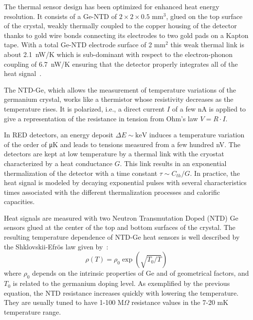 The thermal sensor design has been optimized for enhanced heat energy resolution. It consists of a Ge-NTD of $2\times 2\times 0.5$ mm$^3$, glued on the top surface of the crystal, weakly thermally coupled to the copper housing of the detector thanks to gold wire bonds connecting its electrodes to two gold pads on a Kapton tape. With a total Ge-NTD electrode surface of 2 mm$^2$ this weak thermal link is about 2.1~nW/K which is sub-dominant with respect to the electron-phonon coupling of 6.7~nW/K ensuring that the detector properly integrates all of the heat signal~\cite{Pyle:2015pya}.

The NTD-Ge, which allows the measurement of temperature variations of the germanium crystal, works like a thermistor whose resistivity decreases as the temperature rises. It is polarized, i.e., a direct current $I$ of a few \si{\nano\ampere} is applied to give a representation of the resistance in tension from Ohm's law $V = R \cdot I$. 

 In RED detectors, an energy deposit $\Delta E \sim \si{\kilo\eV}$ induces a temperature variation of the order of \si{\micro\kelvin} and leads to tensions measured from a few hundred \si{\nano\volt}. The detectors are kept at low temperature by a thermal link with the cryostat characterized by a heat conductance $G$. This link results in an exponential thermalization of the detector with a time constant $\tau \sim C_{th}/G$. In practice, the heat signal is modeled by decaying exponential pulses with several characteristics times associated with the different thermalization processes and calorific capacities.

Heat signals are measured with two Neutron Transmutation Doped (NTD) Ge sensors 
glued at the center of the top and bottom surfaces of the crystal. The resulting temperature dependence of NTD-Ge heat sensors is well described by the Shklovskii-Efr\"os law given by~\cite{Mathimalar:2014sfa}:
\begin{equation}
    \rho(T) = \rho_0\exp(\sqrt{T_0/T})
\end{equation}
where $\rho_0$ depends on the intrinsic properties of Ge and of geometrical factors, and $T_0$ is related to the germanium doping level. As exemplified by the previous equation, the NTD resistance increases quickly with lowering the temperature. They are usually tuned to have 1-100 M$\Omega$ resistance values in the 7-20 mK temperature range.


